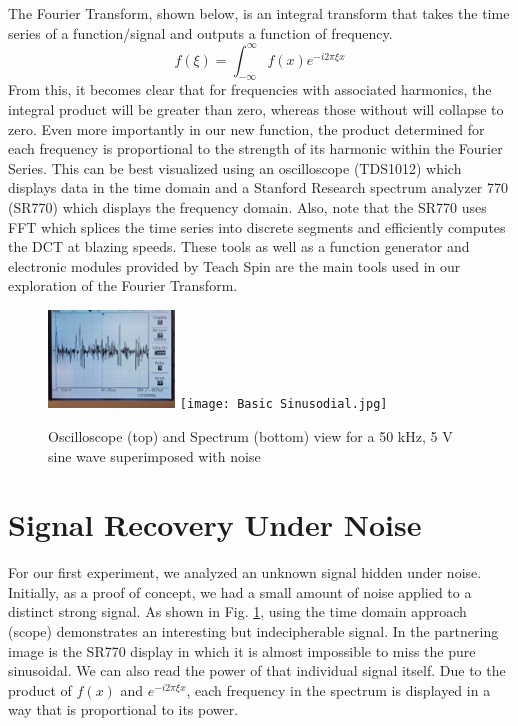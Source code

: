 \documentclass[prl,twocolumn,superscriptaddress,floatfix]{revtex4}
\begin{document}
The Fourier Transform, shown below, is an integral transform that takes the time series of a function/signal and outputs a function of frequency. 
\begin{equation}
f(\xi) = \int_{-\infty}^{\infty} f(x)e^{-i2\pi \xi x}  \label{firstequation}
\end{equation}
From this, it becomes clear that for frequencies with associated harmonics, the integral product will be greater than zero, whereas those without will collapse to zero.
Even more importantly in our new function, the product determined for each frequency is proportional to the strength of its harmonic within the Fourier Series.
This can be best visualized using an oscilloscope (TDS1012) which displays data in the time domain and a Stanford Research spectrum analyzer 770 (SR770) which displays the frequency domain.
Also, note that the SR770 uses FFT which splices the time series into discrete segments and efficiently computes the DCT at blazing speeds. These tools as well as a function generator and electronic modules provided
by Teach Spin are the main tools used in our exploration of the Fourier Transform.

\begin{figure}[H]
    \begin{center}
    \includegraphics[width = 0.3\textwidth]{Time Data.jpg}
    \texttt{[image: Basic Sinusodial.jpg]}
    \caption{\label{fig:1}Oscilloscope (top) and Spectrum (bottom) view for a 50 kHz, 5 V sine wave superimposed with noise}
    \end{center}
\end{figure}

\section{Signal Recovery Under Noise} 
For our first experiment, we analyzed an unknown signal hidden under noise. Initially, as a proof of concept, we had a small amount of noise applied to a distinct strong signal.
As shown in Fig. \ref{fig:1}, using the time domain approach (scope) demonstrates an interesting but indecipherable signal.
In the partnering image is the SR770 display in which it is almost impossible to miss the pure sinusoidal. 
We can also read the power of that individual signal itself. Due to the product of $f(x)$ and $e^{-i2 \pi \xi x}$, each frequency in the spectrum is displayed in a way that is proportional to its power.
\end{document}
